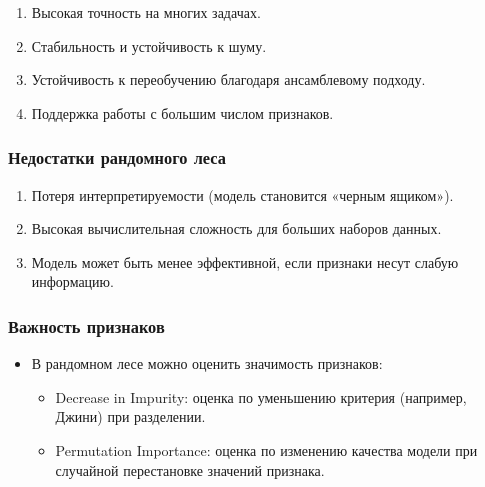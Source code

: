 \begin{enumerate}
\begin{enumerate}
\def\labelenumi{\arabic{enumi}.}
\tightlist
\item
  Высокая точность на многих задачах.
\item
  Стабильность и устойчивость к шуму.
\item
  Устойчивость к переобучению благодаря ансамблевому подходу.
\item
  Поддержка работы с большим числом признаков.
\end{enumerate}

\hypertarget{ux43dux435ux434ux43eux441ux442ux430ux442ux43aux438-ux440ux430ux43dux434ux43eux43cux43dux43eux433ux43e-ux43bux435ux441ux430}{%
\subsubsection*{Недостатки рандомного
леса}\label{ux43dux435ux434ux43eux441ux442ux430ux442ux43aux438-ux440ux430ux43dux434ux43eux43cux43dux43eux433ux43e-ux43bux435ux441ux430}}

\begin{enumerate}
\def\labelenumi{\arabic{enumi}.}
\tightlist
\item
  Потеря интерпретируемости (модель становится «черным ящиком»).
\item
  Высокая вычислительная сложность для больших наборов данных.
\item
  Модель может быть менее эффективной, если признаки несут слабую
  информацию.
\end{enumerate}

\hypertarget{ux432ux430ux436ux43dux43eux441ux442ux44c-ux43fux440ux438ux437ux43dux430ux43aux43eux432}{%
\subsubsection*{Важность
признаков}\label{ux432ux430ux436ux43dux43eux441ux442ux44c-ux43fux440ux438ux437ux43dux430ux43aux43eux432}}

\begin{itemize}
\tightlist
\item
  В рандомном лесе можно оценить значимость признаков:

  \begin{itemize}
  \tightlist
  \item
    Decrease in Impurity: оценка по уменьшению критерия
    (например, Джини) при разделении.
  \item
    Permutation Importance: оценка по изменению качества модели
    при случайной перестановке значений признака.
  \end{itemize}
\end{itemize}


\end{enumerate}
